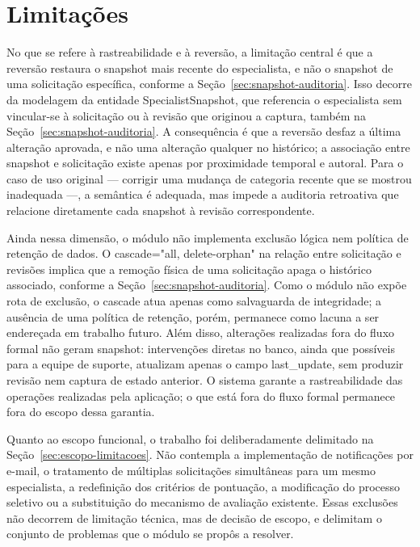 \section{Limitações}
\label{sec:limitacoes}

No que se refere à rastreabilidade e à reversão, a limitação central é que 
a reversão restaura o snapshot mais recente do especialista, e não o snapshot 
de uma solicitação específica, conforme a Seção~\ref{sec:snapshot-auditoria}. Isso decorre da modelagem da 
entidade SpecialistSnapshot, que referencia o especialista sem vincular-se à 
solicitação ou à revisão que originou a captura, também na Seção~\ref{sec:snapshot-auditoria}. A consequência 
é que a reversão desfaz a última alteração aprovada, e não uma alteração 
qualquer no histórico; a associação entre snapshot e solicitação existe apenas 
por proximidade temporal e autoral. Para o caso de uso original — corrigir uma 
mudança de categoria recente que se mostrou inadequada —, a semântica é 
adequada, mas impede a auditoria retroativa que relacione diretamente cada 
snapshot à revisão correspondente.

Ainda nessa dimensão, o módulo não implementa exclusão lógica nem política 
de retenção de dados. O cascade="all, delete-orphan" na relação entre 
solicitação e revisões implica que a remoção física de uma solicitação apaga 
o histórico associado, conforme a Seção~\ref{sec:snapshot-auditoria}. Como o módulo não expõe rota de 
exclusão, o cascade atua apenas como salvaguarda de integridade; a 
ausência de uma política de retenção, porém, permanece como lacuna a ser 
endereçada em trabalho futuro. Além disso, alterações realizadas fora do 
fluxo formal não geram snapshot: intervenções diretas no banco, ainda que 
possíveis para a equipe de suporte, atualizam apenas o campo last\_update, 
sem produzir revisão nem captura de estado anterior. O 
sistema garante a rastreabilidade das operações realizadas pela aplicação; 
o que está fora do fluxo formal permanece fora do escopo dessa garantia.

Quanto ao escopo funcional, o trabalho foi deliberadamente delimitado na Seção~\ref{sec:escopo-limitacoes}. 
Não contempla a implementação de notificações por e-mail, o tratamento de 
múltiplas solicitações simultâneas para um mesmo especialista, a redefinição 
dos critérios de pontuação, a modificação do processo seletivo ou a substituição 
do mecanismo de avaliação existente. Essas exclusões não decorrem de limitação 
técnica, mas de decisão de escopo, e delimitam o conjunto de problemas que o 
módulo se propôs a resolver.

